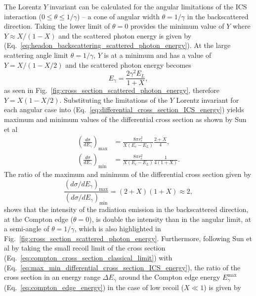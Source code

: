 \documentclass[../main.tex]{subfiles}
\begin{document}
The Lorentz $Y$ invariant can be calculated for the angular limitations of the ICS interaction ($0 \leq \theta \leq 1/\gamma$) -- a cone of angular width $\theta=1/\gamma$ in the backscattered direction. Taking the lower limit of $\theta = 0$ provides the minimum value of $Y$ where $Y \approx X/\left(1-X\right)$ and the scattered photon energy is given by (Eq.~\ref{eq:headon_backscattering_scattered_photon_energy}). At the large scattering angle limit $\theta = 1/\gamma$, $Y$ is at a minimum and has a value of $Y = X/\left(1-X/2\right)$ and the scattered photon energy becomes
\begin{equation}
E_{\gamma} = \frac{2\gamma^{2}E_{L}}{1+X},
\label{eq:angular_limit_scattered_photon_energy}
\end{equation}
as seen in Fig.~\ref{fig:cross_section_scattered_photon_energy}, therefore $Y = X\left(1-X/2\right)$. Substituting the limitations of the $Y$ Lorentz invariant for each angular case into (Eq.~\ref{eq:differential_cross_section_ICS_energy}) yields maximum and minimum values of the differential cross section as shown by Sun et al \cite{sun2011theoretical}
\begin{align}
\left(\frac{d\sigma}{dE_{\gamma}}\right)_{\mathrm{max}} &= \frac{8\pi r_{e}^{2}}{X\left(E_{e}-E_{L}\right)}\frac{2+X}{4}, \nonumber \\
\left(\frac{d\sigma}{dE_{\gamma}}\right)_{\mathrm{min}} &= \frac{8\pi r_{e}^{2}}{X\left(E_{e}-E_{L}\right)}\frac{1}{4\left(1+X\right)}.
\label{eq:max_min_differential_cross_section_ICS_energy}    
\end{align}
The ratio of the maximum and minimum of the differential cross section given by 
\begin{equation}
\frac{\left(d\sigma/dE_{\gamma}\right)_{\mathrm{max}}}{\left(d\sigma/dE_{\gamma}\right)_{\mathrm{min}}} = \left(2+X\right)\left(1+X\right) \approx 2,
\label{eq:max_min_cross_section_ratio}
\end{equation}
shows that the intensity of the radiation emission in the backscattered direction, at the Compton edge ($\theta=0$), is double the intensity than in the angular limit, at a semi-angle of $\theta=1/\gamma$, which is also highlighted in Fig.~\ref{fig:cross_section_scattered_photon_energy}. Furthermore, following Sun et al \cite{sun2011theoretical} by taking the small recoil limit of the cross section (Eq.~\ref{eq:compton_cross_section_classical_limit}) with (Eq.~\ref{eq:max_min_differential_cross_section_ICS_energy}), the ratio of the cross section in an energy range $\Delta E_{\gamma}$ around the Compton edge energy $E_{\gamma}^{\mathrm{max}}$ (Eq.~\ref{eq:compton_edge_energy}) in the case of low recoil ($X \ll 1$) is given by
\end{document}
